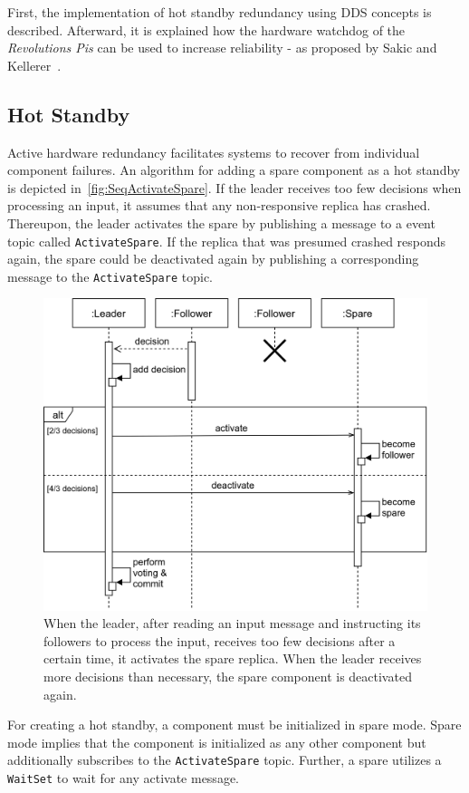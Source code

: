 \noindent
First, the implementation of hot standby redundancy using DDS concepts is described.
Afterward, it is explained how the hardware watchdog of the \textit{Revolutions Pis} can be used to increase reliability - as proposed by Sakic and Kellerer~\cite{SakicTimeInConsensus}.

\subsection{Hot Standby}
\label{sec:HotStandby}

Active hardware redundancy facilitates systems to recover from individual component failures.
An algorithm for adding a spare component as a hot standby is depicted in~\autoref{fig:SeqActivateSpare}.
If the leader receives too few decisions when processing an input, it assumes that any non-responsive replica has crashed.
Thereupon, the leader activates the spare by publishing a message to a  event topic called \texttt{ActivateSpare}.
If the replica that was presumed crashed responds again, the spare could be deactivated again by publishing a corresponding message to the \texttt{ActivateSpare} topic.

\begin{figure}[!hb]
	\centering
	\includegraphics[width=0.75\linewidth]{images/sequence/ActivateSpare}
	\caption{When the leader, after reading an input message and instructing its followers to process the input, receives too few decisions after a certain time, it activates the spare replica. When the leader receives more decisions than necessary, the spare component is deactivated again.}
	\label{fig:SeqActivateSpare}
\end{figure}

\noindent
For creating a hot standby, a component must be initialized in spare mode.
Spare mode implies that the component is initialized as any other component but additionally subscribes to the \texttt{ActivateSpare} topic.
Further, a spare utilizes a \texttt{WaitSet} to wait for any activate message.
\\

